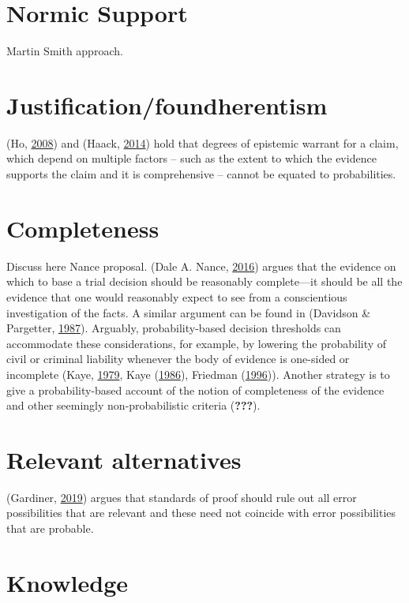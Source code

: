 \documentclass[]{book}
\begin{document}
\section{Normic Support}

Martin Smith approach.

\section{Justification/foundherentism}

(Ho, \protect\hyperlink{ref-ho2008philosophy}{2008}) and (Haack,
\protect\hyperlink{ref-Haack2014-HAAEMS}{2014}) hold that degrees of
epistemic warrant for a claim, which depend on multiple factors -- such
as the extent to which the evidence supports the claim and it is
comprehensive -- cannot be equated to probabilities.

\section{Completeness}

Discuss here Nance proposal. (Dale A. Nance,
\protect\hyperlink{ref-nance2016}{2016}) argues that the evidence on
which to base a trial decision should be reasonably complete---it should
be all the evidence that one would reasonably expect to see from a
conscientious investigation of the facts. A similar argument can be
found in (Davidson \& Pargetter,
\protect\hyperlink{ref-davidsonpargetter1987}{1987}). Arguably,
probability-based decision thresholds can accommodate these
considerations, for example, by lowering the probability of civil or
criminal liability whenever the body of evidence is one-sided or
incomplete (Kaye, \protect\hyperlink{ref-Kaye79gate}{1979}, Kaye
(\protect\hyperlink{ref-Kaye1986Do}{1986}), Friedman
(\protect\hyperlink{ref-friedman1996}{1996})). Another strategy is to
give a probability-based account of the notion of completeness of the
evidence and other seemingly non-probabilistic criteria
({\textbf{???}}).

\section{Relevant alternatives}

(Gardiner, \protect\hyperlink{ref-gardiner2019ppa}{2019}) argues that
standards of proof should rule out all error possibilities that are
relevant and these need not coincide with error possibilities that are
probable.

\section{Knowledge}
\end{document}
